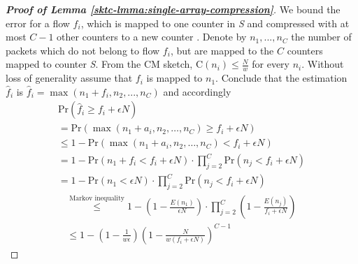\begin{proof}[\textbf{Proof of Lemma \ref{sktc-lmma:single-array-compression}}]
We bound the error for a flow $f_i$, which is mapped to one counter in \textsl{S} and compressed with at most $C-1$ other counters to a new counter . Denote by $n_1,...,n_C$ the number of packets which do not belong to flow $f_i$, but are mapped to the $C$ counters mapped to counter \textsl{S}. From the CM sketch, $\text{C}(n_i) \leq \frac{N}{w}$ for every $n_i$.
Without loss of generality assume that $f_i$ is mapped to $n_1$. Conclude that the estimation $\hat{f}_i$ is 
$\hat{f}_i = \max(n_1+f_i,n_2,...,n_C)$ and accordingly
\begin{gather*}
\text{Pr}(\hat{f}_i \geq f_i + \epsilon N)\\ 
=\text{Pr}(\max(n_1+a_i,n_2,\dots,n_C) \geq f_i + \epsilon N)  \\ 
\leq 1 - \text{Pr}(\max(n_1+a_i,n_2,\dots,n_C) < f_i + \epsilon N)  \\ 
=1 - \text{Pr}(n_1+f_i < f_i + \epsilon N)\cdot \prod\limits_{j=2}^C \text{Pr}(n_j < f_i + \epsilon N) \\
= 1 - \text{Pr}(n_1 < \epsilon N) \cdot \prod\limits_{j=2}^C \text{Pr}(n_j < f_i + \epsilon N)
\end{gather*}
\begin{gather*}
 \stackrel{\text{Markov inequality}}{\leq} 1 - \left(1-\frac{E(n_1)}{\epsilon N}\right) \cdot \prod\limits_{j=2}^C \left(1-\frac{E(n_j)}{f_i + \epsilon N}\right) \\
\leq  1- \left(1-\frac{1}{w\epsilon}\right)\left(1-\frac{N}{w(f_i+\epsilon N)}\right)^{C-1}
\end{gather*}


\end{proof}
